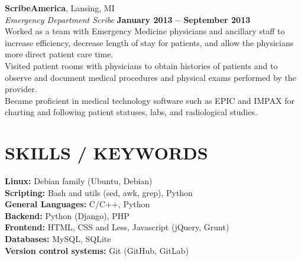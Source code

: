 \documentclass[margin,line]{resume}
\begin{document}
\begin{resume}
    \textbf{\listing ScribeAmerica}, Lansing, MI \vspace{2mm}\\\vspace{2mm}%
    \textsl{Emergency Department Scribe} \hfill \textbf{January 2013 -- September 2013}\\
    Worked as a team with Emergency Medicine physicians and ancillary staff to increase efficiency, decrease length of stay for patients, and allow the physicians more direct patient care time.\\
    Visited patient rooms with physicians to obtain histories of patients and to observe and document medical procedures and physical exams performed by the provider.\\
    Became proficient in medical technology software such as EPIC and IMPAX for charting and following patient statuses, labs, and radiological studies.

\sectionline

    \section{\mysidestyle \textbf{\large{S}\small{KILLS} / \large{K}\small{EYWORDS}}}

    \textbf{Linux:} Debian family (Ubuntu, Debian)\\
    \textbf{Scripting:} Bash and utils (sed, awk, grep), Python\\
    \textbf{General Languages:} C/C++, Python\\ 
    \textbf{Backend:} Python (Django), PHP\\
    \textbf{Frontend:} HTML, CSS and Less, Javascript (jQuery, Grunt)\\
    \textbf{Databases:} MySQL, SQLite\\
    \textbf{Version control systems:} Git (GitHub, GitLab)\\


\end{resume}
\end{document}
